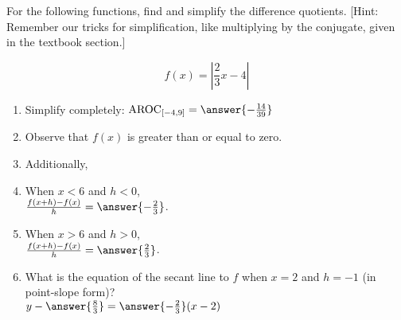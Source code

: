 \documentclass{ximera}
\author{Elizabeth Campolongo}
\begin{document}
\begin{exercise}

For the following functions, 
find and simplify the difference quotients. [Hint: Remember our tricks for simplification, like multiplying by the conjugate, given in the textbook section.]

$$f(x)= \left|\frac{2}{3}x-4\right|$$

\begin{enumerate}

\item Simplify completely:
$\av_{[-4,9]} = \answer{-\frac{14}{39}}$
\item Observe that $f(x)$ is  greater than or equal to zero.
\item Additionally,
\begin{multipleChoice}
\end{multipleChoice}

\item When $x<6$ and $h<0$,\\
$\frac{f(x+h)-f(x)}{h} = \answer{-\frac{2}{3}}$.  

\item When $x>6$ and $h>0$,\\
$\frac{f(x+h)-f(x)}{h} = \answer{\frac{2}{3}}$.  

\item What is the equation of the secant line to $f$ when $x = 2$ and $h=-1$ (in point-slope form)?\\
$y-\answer{\frac{8}{3}}= \answer{-\frac{2}{3}}(x-2)$

\end{enumerate}
\end{exercise}
\end{document}
